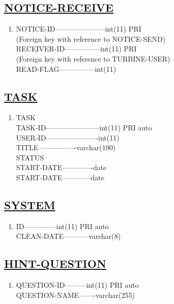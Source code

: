 \documentclass{article}
\begin{document}
\subsection*{\underline{NOTICE-RECEIVE}}
\begin{enumerate}
\item[{}{}]

NOTICE-ID---------------------int(11)                 PRI \\
(Foreign key with reference to NOTICE-SEND) \\
RECEIVER-ID---------------int(11)                 PRI \\
(Foreign key with reference to TURBINE-USER) \\
READ-FLAG---------------int(11)\\
\end{enumerate}
\subsection*{\underline{TASK}}
\begin{enumerate}
\item[{}{}]

TASK  \\ 
TASK-ID-----------------------int(11)              PRI         auto \\
USER-ID----------------------int(11) \\
TITLE----------------varchar(100)\\ 
STATUS\\ 
START-DATE-------------date \\
START-DATE------------date\\
\end{enumerate}
\subsection*{\underline{SYSTEM}}
\begin{enumerate}
\item[{}{}]

ID--------------int(11)               PRI             auto \\
CLEAN-DATE-----------varchar(8)\\
\end{enumerate}
\subsection*{\underline{HINT-QUESTION}}
\begin{enumerate}
\item[{}{}]

QUESTION-ID---------int(11)             PRI                auto \\
QUESTION-NAME-------varchar(255)\\
\end{enumerate}
\end{document}
